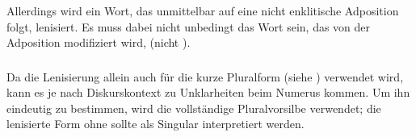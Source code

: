 Allerdings wird ein Wort, das unmittelbar auf eine nicht enklitische Adposition folgt, lenisiert. Es muss dabei nicht unbedingt das Wort sein, das von der Adposition modifiziert wird,   (nicht ).

\subsubsection{} Da die Lenisierung allein auch für die kurze Pluralform (siehe ) verwendet wird, kann es je nach Diskurskontext zu Unklarheiten beim Numerus kommen. Um ihn eindeutig zu bestimmen, wird die vollständige Pluralvorsilbe  verwendet; die lenisierte Form ohne  sollte als Singular interpretiert werden.
\label{syn:adp:short-plural}


